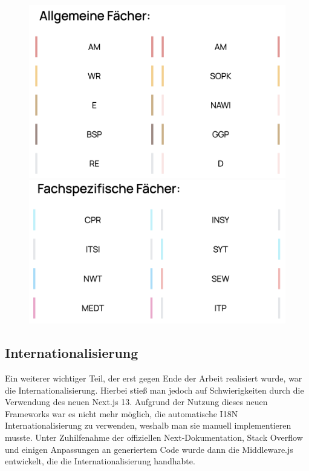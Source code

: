\begin{figure}
    \begin{minipage}[b]{.4\linewidth} 
       \includegraphics[width=\linewidth]{pics/timetable-allg.png}
       \caption{}
       \label{fig:impl:timetable_allg}
    \end{minipage}
    \hspace{.05\linewidth}
    \begin{minipage}[b]{.4\linewidth}
       \includegraphics[width=\linewidth]{pics/timetable-spez.png}
       \caption{}
       \label{fig:impl:timetable_spez}
    \end{minipage}
 \end{figure}

\subsection{Internationalisierung}

Ein weiterer wichtiger Teil, der erst gegen Ende der Arbeit realisiert wurde, war die Internationalisierung. 
Hierbei stieß man jedoch auf Schwierigkeiten durch die Verwendung des neuen Next.js 13. 
Aufgrund der Nutzung dieses neuen Frameworks war es nicht mehr möglich, die automatische I18N Internationalisierung zu verwenden, weshalb man sie manuell implementieren musste. 
Unter Zuhilfenahme der offiziellen Next-Dokumentation, Stack Overflow und einigen Anpassungen an generiertem Code wurde dann die Middleware.js entwickelt, die die Internationalisierung handhabte.

